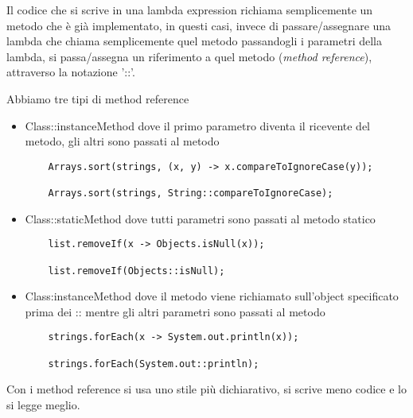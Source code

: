 Il codice che si scrive in una lambda expression richiama semplicemente un metodo che è già implementato, in questi casi, invece di passare/assegnare una lambda che 
chiama semplicemente quel metodo passandogli i parametri della lambda, si passa/assegna un riferimento a quel metodo (\textit{method reference}), attraverso la 
notazione '::'.

Abbiamo tre tipi di method reference
\begin{itemize}
    \item Class::instanceMethod dove il primo parametro diventa il ricevente del metodo, gli altri sono passati al metodo
    \begin{lstlisting}
    Arrays.sort(strings, (x, y) -> x.compareToIgnoreCase(y));

    Arrays.sort(strings, String::compareToIgnoreCase);
    \end{lstlisting}
    \item Class::staticMethod dove tutti parametri sono passati al metodo statico
    \begin{lstlisting}
    list.removeIf(x -> Objects.isNull(x));
    
    list.removeIf(Objects::isNull);
    \end{lstlisting}
    \item Class:instanceMethod dove il metodo viene richiamato sull’object specificato prima dei :: mentre gli altri parametri sono passati al metodo
    \begin{lstlisting}
    strings.forEach(x -> System.out.println(x));

    strings.forEach(System.out::println);
    \end{lstlisting}
\end{itemize}

Con i method reference si usa uno stile più dichiarativo, si scrive meno codice e lo si legge meglio.
